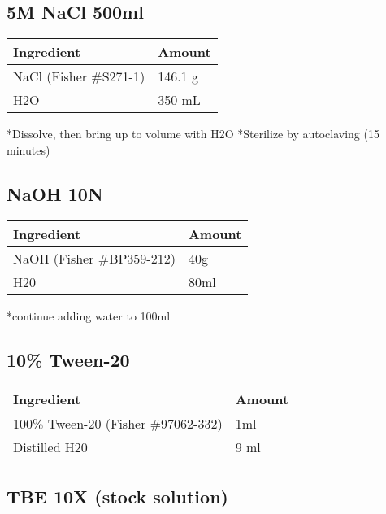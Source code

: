 \documentclass[
  letterpaper,
  DIV=11,
  numbers=noendperiod]{scrreprt}
\begin{document}
\hypertarget{m-nacl-500ml}{%
\subsection*{\texorpdfstring{\textbf{5M NaCl
500ml}}{5M NaCl 500ml}}\label{m-nacl-500ml}}

\begin{longtable}[]{@{}ll@{}}
\toprule()
\textbf{Ingredient} & \textbf{Amount} \\
\midrule()
\endhead
NaCl (Fisher \#S271-1) & 146.1 g \\
H2O & 350 mL \\
\bottomrule()
\end{longtable}

*Dissolve, then bring up to volume with H2O *Sterilize by autoclaving
(15 minutes)

\hypertarget{naoh-10n}{%
\subsection*{\texorpdfstring{\textbf{NaOH
10N}}{NaOH 10N}}\label{naoh-10n}}

\begin{longtable}[]{@{}ll@{}}
\toprule()
\textbf{Ingredient} & \textbf{Amount} \\
\midrule()
\endhead
NaOH (Fisher \#BP359-212) & 40g \\
H20 & 80ml \\
\bottomrule()
\end{longtable}

*continue adding water to 100ml

\hypertarget{tween-20}{%
\subsection*{\texorpdfstring{\textbf{10\%
Tween-20}}{10\% Tween-20}}\label{tween-20}}

\begin{longtable}[]{@{}ll@{}}
\toprule()
\textbf{Ingredient} & \textbf{Amount} \\
\midrule()
\endhead
100\% Tween-20 (Fisher \#97062-332) & 1ml \\
Distilled H20 & 9 ml \\
\bottomrule()
\end{longtable}

\hypertarget{tbe-10x-stock-solution}{%
\subsection*{\texorpdfstring{\textbf{TBE 10X (stock
solution)}}{TBE 10X (stock solution)}}\label{tbe-10x-stock-solution}}
\end{document}
